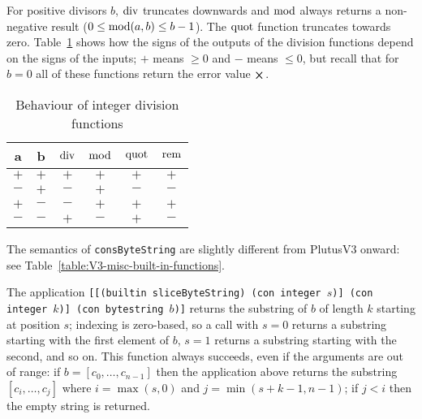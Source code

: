 For positive divisors $b$, $\operatorname{div}$ truncates downwards and $\operatorname{mod}$ always
returns a non-negative result ($0 \leq \operatorname{mod}(a,b) \leq b-1$).  The $\operatorname{quot}$
function truncates towards zero.  Table~\ref{table:integer-division-signs} shows
how the signs of the outputs of the division functions depend on the signs of
the inputs; $+$ means $\geq 0$ and $-$ means $\leq 0$, but recall that for $b=0$
all of these functions return the error value $\errorX$.
\begin{table}[H]
  \centering
    \begin{tabular}{|cc|cc|cc|}
        \hline
        a & b & $\operatorname{div}$ & $\operatorname{mod}$ & $\operatorname{quot}$ & $\operatorname{rem}$ \\
        \hline
        $+$ & $+$ & $+$ & $+$ & $+$ & $+$ \\
        $-$ & $+$ & $-$ & $+$ & $-$ & $-$ \\
        $+$ & $-$ & $-$ & $+$ & $+$ & $+$ \\
        $-$ & $-$ & $+$ & $-$ & $+$ & $-$ \\
        \hline
        \end{tabular}
   \caption{Behaviour of integer division functions}
   \label{table:integer-division-signs}
\end{table}

\label{note:consbytestring}
The semantics of \texttt{consByteString} are slightly different
from PlutusV3 onward: see Table~\ref{table:V3-misc-built-in-functions}.

\label{note:slicebytestring}
The application \texttt{[[(builtin sliceByteString) (con integer $s$)] (con
    integer $k$)] (con bytestring $b$)]} returns the substring of $b$ of length
$k$ starting at position $s$; indexing is zero-based, so a call with $s=0$
returns a substring starting with the first element of $b$, $s=1$ returns a
substring starting with the second, and so on.  This function always succeeds,
even if the arguments are out of range: if $b=[c_0, \ldots, c_{n-1}]$ then the
  application above returns the substring $[c_i, \ldots, c_j]$ where
  $i=\max(s,0)$ and $j=\min(s+k-1, n-1)$; if $j<i$ then the empty string is returned.
  

